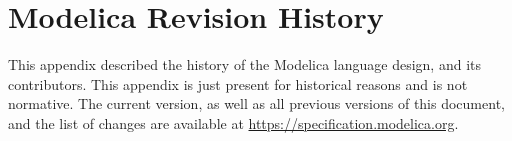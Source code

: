 \chapter{Modelica Revision History}\label{modelica-revision-history}

This appendix described the history of the Modelica language design, and its contributors.
This appendix is just present for historical reasons and is not normative.
The current version, as well as all previous versions of this document, and the list of changes are available at \url{https://specification.modelica.org}.

